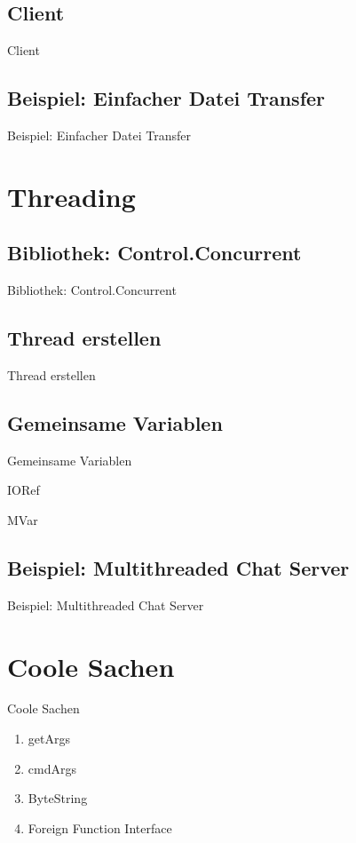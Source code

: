 \documentclass{beamer}
\begin{document}
\subsection{Client}
\begin{frame}{Client}
\end{frame}

\subsection{Beispiel: Einfacher Datei Transfer}
\begin{frame}{Beispiel: Einfacher Datei Transfer}
\end{frame}

\section{Threading}
\subsection{Bibliothek: Control.Concurrent}
\begin{frame}{Bibliothek: Control.Concurrent}
\end{frame}

\subsection{Thread erstellen}
\begin{frame}{Thread erstellen}
\end{frame}

\subsection{Gemeinsame Variablen}
\begin{frame}{Gemeinsame Variablen}
\end{frame}

\begin{frame}{IORef}
\end{frame}

\begin{frame}{MVar}
\end{frame}

\subsection{Beispiel: Multithreaded Chat Server}
\begin{frame}{Beispiel: Multithreaded Chat Server}
\end{frame}

\section{Coole Sachen}
\begin{frame}{Coole Sachen}
\begin{enumerate}
\item getArgs
\item cmdArgs
\item ByteString
\item Foreign Function Interface
\end{enumerate}
\end{frame}
\end{document}

